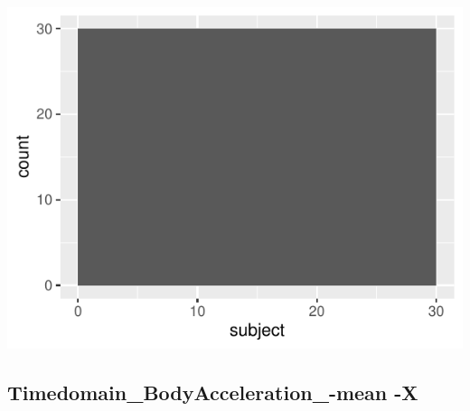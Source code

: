 \documentclass[
]{article}
\begin{document}
\begin{minipage}{0.25 \textwidth}

\includegraphics{codebook_tidydatasub_files/figure-latex/Var-2-subject-1.pdf}

\end{minipage}

\noindent\makebox[\linewidth]{\rule{\textwidth}{0.4pt}}

\hypertarget{timedomain_bodyacceleration_-mean--x}{%
\subsection{Timedomain\_BodyAcceleration\_-mean
-X}\label{timedomain_bodyacceleration_-mean--x}}
\end{document}
